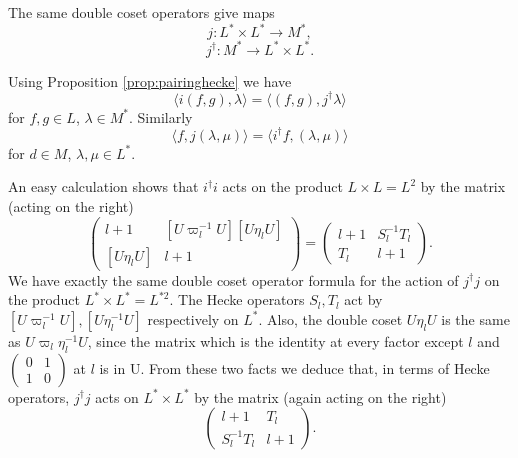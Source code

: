 \documentclass[a4paper, notitlepage]{amsart}
\begin{document}
The same double coset operators give maps $$j:L^* \times L^* \rightarrow M^*,$$ $$j^\dagger: M^* \rightarrow L^* \times L^*.$$

Using Proposition \ref{prop:pairinghecke} we have 
$$\langle i(f,g),\lambda\rangle = \langle (f,g), j^\dagger \lambda \rangle$$
for $f,g\in L$, $\lambda \in M^*$. Similarly
$$\langle f,j(\lambda,\mu)\rangle = \langle i^\dagger f, (\lambda,\mu) \rangle$$ for $d \in M$, $\lambda,\mu \in L^*$.


An easy calculation shows that $i^\dagger i$ acts on the product $L\times L=L^2$ by the matrix (acting on the right) $$\begin{pmatrix}l+1 & [U\varpi_l^{-1}U][U\eta_l U] \\ [U\eta_l U] & l+1 \end{pmatrix}=\begin{pmatrix}l+1 & S_l^{-1}T_l \\ T_l & l+1 \end{pmatrix}.$$ We have exactly the same double coset operator formula for the action of $j^\dagger j$ on the product $L^*\times L^* = L^{*2}$. The Hecke operators $S_l, T_l$ act by $[U\varpi_l^{-1}U], [U\eta_l^{-1} U]$ respectively on $L^*$. Also, the double coset $U\eta_l U$ is the same as $U\varpi_l \eta_l^{-1}U$, since the matrix which is the identity at every factor except $l$ and $\begin{pmatrix}
0 & 1\\1&0
\end{pmatrix}$ at $l$ is in U. From these two facts we deduce that, in terms of Hecke operators, $j^\dagger j$ acts on $L^*\times L^*$ by the matrix (again acting on the right) $$\begin{pmatrix}l+1 & T_l \\ S_l^{-1}T_l & l+1 \end{pmatrix}.$$
\end{document}
